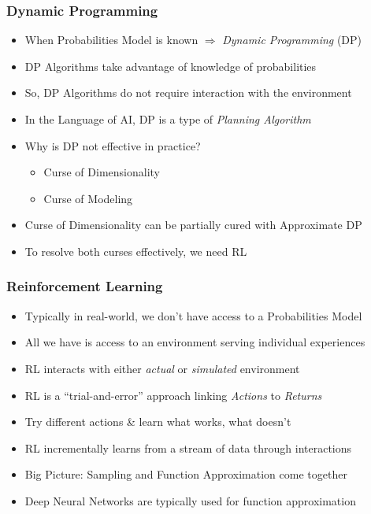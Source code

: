 \documentclass[handout]{beamer}
\begin{document}
\begin{frame}
\frametitle{Dynamic Programming}
\pause
\begin{itemize}[<+->]
\item When Probabilities Model is known $\Rightarrow$ {\em Dynamic Programming} (DP)
\item DP Algorithms take advantage of knowledge of probabilities
\item So, DP Algorithms do not require interaction with the environment
\item In the Language of AI, DP is a type of {\em Planning Algorithm}
\item Why is DP not effective in practice?
\pause
\begin{itemize}[<+->]
\item Curse of Dimensionality
\item Curse of Modeling
\end{itemize}
\item Curse of Dimensionality can be partially cured with Approximate DP
\item To resolve both curses effectively, we need RL
\end{itemize}
\end{frame}

\begin{frame}
\frametitle{Reinforcement Learning}
\pause
\begin{itemize}[<+->]
\item Typically in real-world, we don't have access to a Probabilities Model
\item All we have is access to an environment serving individual experiences
\item RL interacts with either {\em actual} or {\em simulated} environment
\item RL is a ``trial-and-error'' approach linking {\em Actions} to {\em Returns}
\item Try different actions \& learn what works, what doesn't
\item RL incrementally learns from a stream of data through interactions
\item Big Picture: Sampling and Function Approximation come together
\item Deep Neural Networks are typically used for function approximation
\end{itemize}
\end{frame}
\end{document}
